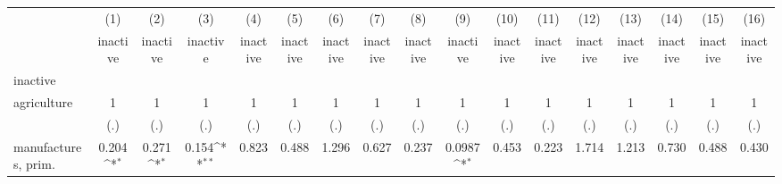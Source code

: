 {
\def\sym#1{\ifmmode^{#1}\else\(^{#1}\)\fi}
\begin{tabular}{l*{16}{c}}
\hline\hline
                    &\multicolumn{1}{c}{(1)}&\multicolumn{1}{c}{(2)}&\multicolumn{1}{c}{(3)}&\multicolumn{1}{c}{(4)}&\multicolumn{1}{c}{(5)}&\multicolumn{1}{c}{(6)}&\multicolumn{1}{c}{(7)}&\multicolumn{1}{c}{(8)}&\multicolumn{1}{c}{(9)}&\multicolumn{1}{c}{(10)}&\multicolumn{1}{c}{(11)}&\multicolumn{1}{c}{(12)}&\multicolumn{1}{c}{(13)}&\multicolumn{1}{c}{(14)}&\multicolumn{1}{c}{(15)}&\multicolumn{1}{c}{(16)}\\
                    &\multicolumn{1}{c}{inactive}&\multicolumn{1}{c}{inactive}&\multicolumn{1}{c}{inactive}&\multicolumn{1}{c}{inactive}&\multicolumn{1}{c}{inactive}&\multicolumn{1}{c}{inactive}&\multicolumn{1}{c}{inactive}&\multicolumn{1}{c}{inactive}&\multicolumn{1}{c}{inactive}&\multicolumn{1}{c}{inactive}&\multicolumn{1}{c}{inactive}&\multicolumn{1}{c}{inactive}&\multicolumn{1}{c}{inactive}&\multicolumn{1}{c}{inactive}&\multicolumn{1}{c}{inactive}&\multicolumn{1}{c}{inactive}\\
\hline
inactive            &                     &                     &                     &                     &                     &                     &                     &                     &                     &                     &                     &                     &                     &                     &                     &                     \\
agriculture         &           1         &           1         &           1         &           1         &           1         &           1         &           1         &           1         &           1         &           1         &           1         &           1         &           1         &           1         &           1         &           1         \\
                    &         (.)         &         (.)         &         (.)         &         (.)         &         (.)         &         (.)         &         (.)         &         (.)         &         (.)         &         (.)         &         (.)         &         (.)         &         (.)         &         (.)         &         (.)         &         (.)         \\
[1em]
manufactures, prim. &       0.204\sym{*}  &       0.271\sym{*}  &       0.154\sym{**} &       0.823         &       0.488         &       1.296         &       0.627         &       0.237         &      0.0987\sym{*}  &       0.453         &       0.223         &       1.714         &       1.213         &       0.730         &       0.488         &       0.430         \\

\end{tabular}}
